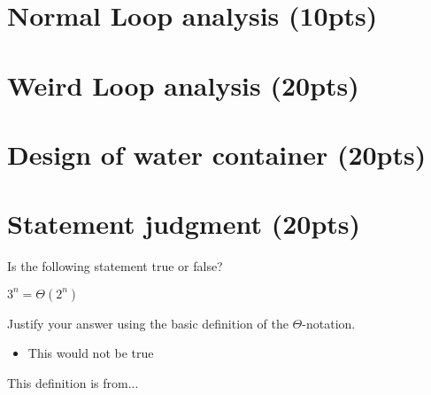 \documentclass{article}[12pt]
\begin{document}
\newpage
\section{Normal Loop analysis (10pts)}

\newpage
\section{Weird Loop analysis (20pts)}

\newpage
\section{Design of water container (20pts)}

\newpage
\section{Statement judgment (20pts)}
Is the following statement true or false?
\begin{center}
{$3^n = \Theta(2^n)$}
\end{center}
{Justify your answer using the basic definition of the $\Theta$-notation.}

\begin{itemize}
  \item This would not be true
\end{itemize}

\newpage
\begin{thebibliography}{99}
 This definition is from...
\end{thebibliography}
\end{document}
